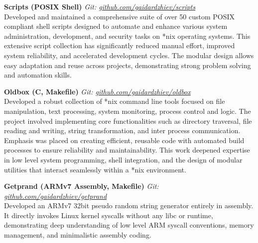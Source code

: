 \documentclass[a4paper,10pt]{article}
\begin{document}
\vspace{6pt}

\noindent
\textbf{Scripts (POSIX Shell)} \hfill \textit{Git: \href{https://github.com/gaidardzhiev/scripts}{github.com/gaidardzhiev/scripts}} \\
Developed and maintained a comprehensive suite of over 50 custom POSIX compliant shell scripts designed to automate and enhance various system administration, development, and security tasks on *nix operating systems. This extensive script collection has significantly reduced manual effort, improved system reliability, and accelerated development cycles. The modular design allows easy adaptation and reuse across projects, demonstrating strong problem solving and automation skills.

\vspace{6pt}

\noindent
\textbf{Oldbox (C, Makefile)} \hfill \textit{Git: \href{https://github.com/gaidardzhiev/oldbox}{github.com/gaidardzhiev/oldbox}} \\
Developed a robust collection of *nix command line tools focused on file manipulation, text processing, system monitoring, process control and logic. The project involved implementing core functionalities such as directory traversal, file reading and writing, string transformation, and inter process communication. Emphasis was placed on creating efficient, reusable code with automated build processes to ensure reliability and maintainability. This work deepened expertise in low level system programming, shell integration, and the design of modular utilities that interact seamlessly within a *nix environment.

\vspace{6pt}

\noindent
\textbf{Getprand (ARMv7 Assembly, Makefile)} \hfill \textit{Git: \href{https://github.com/gaidardzhiev/getprand}{github.com/gaidardzhiev/getprand}} \\
Developed an ARMv7 32bit pseudo random string generator entirely in assembly. It directly invokes Linux kernel syscalls without any libc or runtime, demonstrating deep understanding of low level ARM syscall conventions, memory management, and minimalistic assembly coding.
\end{document}
